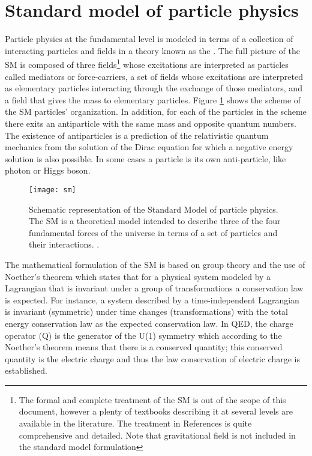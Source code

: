 \section{Standard model of particle physics}
\label{secc:SM}

Particle physics at the fundamental level is modeled in terms of a collection of interacting particles and fields in a theory known as the . The full picture of the SM is composed of three fields\footnote{The formal and complete treatment of the SM is out of the scope of this document, however a plenty of textbooks describing it at several levels are available in the literature. The treatment in References \cite{mandl,halzen} is quite comprehensive and detailed. Note that gravitational field is not included in the standard model formulation} whose excitations are interpreted as particles called mediators or force-carriers, a set of fields whose excitations are interpreted as elementary particles interacting through the exchange of those mediators, and a field that gives the mass to elementary particles. Figure \ref{sm} shows the scheme of the SM particles' organization. In addition, for each of the particles in the scheme there exits an antiparticle with the same mass and opposite quantum numbers. The existence of antiparticles is a prediction of the relativistic quantum mechanics from the solution of the Dirac equation for which a negative energy solution is also possible. In some cases a particle is its own anti-particle, like photon or Higgs boson.

\begin{figure}[h!]
  \centering
  \texttt{[image: sm]}
  \caption[Standard Model of particle physics.]{Schematic representation of the Standard Model of particle physics. The SM is a theoretical model intended to describe three of the four fundamental forces of the universe in terms of a set of particles and their interactions. \cite{smpicture}.}
  \label{sm}
\end{figure}

The mathematical formulation of the SM is based on group theory and the use of Noether's theorem\cite{noether} which states that for a physical system modeled by a Lagrangian that is invariant under a group of transformations a conservation law is expected. For instance, a system described by a time-independent Lagrangian is invariant (symmetric) under time changes (transformations) with the total energy conservation law as the expected conservation law. In QED, the charge operator (Q) is the generator of the U(1) symmetry which according to the Noether's theorem means that there is a conserved quantity; this conserved quantity is the electric charge and thus the law conservation of electric charge is established.

